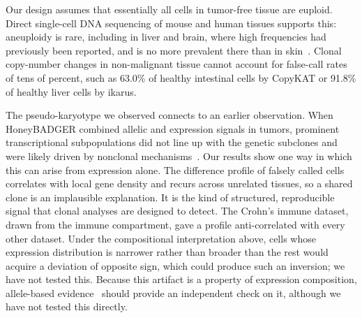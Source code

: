 \documentclass[11pt,letterpaper]{article}
\begin{document}
Our design assumes that essentially all cells in tumor-free tissue are euploid. Direct single-cell DNA sequencing of mouse and human tissues supports this: aneuploidy is rare, including in liver and brain, where high frequencies had previously been reported, and is no more prevalent there than in skin~\cite{knouse2014}. Clonal copy-number changes in non-malignant tissue cannot account for false-call rates of tens of percent, such as 63.0\% of healthy intestinal cells by CopyKAT or 91.8\% of healthy liver cells by ikarus.

The pseudo-karyotype we observed connects to an earlier observation. When HoneyBADGER combined allelic and expression signals in tumors, prominent transcriptional subpopulations did not line up with the genetic subclones and were likely driven by nonclonal mechanisms~\cite{honeybadger}. Our results show one way in which this can arise from expression alone. The difference profile of falsely called cells correlates with local gene density and recurs across unrelated tissues, so a shared clone is an implausible explanation. It is the kind of structured, reproducible signal that clonal analyses are designed to detect. The Crohn's immune dataset, drawn from the immune compartment, gave a profile anti-correlated with every other dataset. Under the compositional interpretation above, cells whose expression distribution is narrower rather than broader than the rest would acquire a deviation of opposite sign, which could produce such an inversion; we have not tested this. Because this artifact is a property of expression composition, allele-based evidence~\cite{honeybadger,numbat} should provide an independent check on it, although we have not tested this directly.
\end{document}
